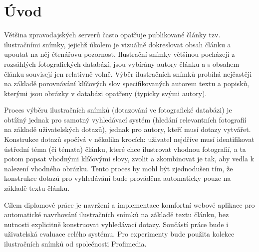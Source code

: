 \chapter*{Úvod}

Většina zpravodajských serverů často opatřuje publikované články tzv. ilustračními snímky, jejichž úkolem je vizuálně dokreslovat obsah článku a upoutat na něj čtenářovu pozornost. Ilustrační snímky většinou pocházejí z rozsáhlých fotografických databází, jsou vybírány autory článku a s obsahem článku souvisejí jen relativně volně. Výběr ilustračních snímků probíhá nejčastěji na základě porovnávání klíčových slov specifikovaných autorem textu a popisků, kterými jsou obrázky v databázi opatřeny (typicky svými autory). 

Proces výběru ilustračních snímků (dotazování ve fotografické databázi) je obtížný jednak pro samotný vyhledávací systém (hledání relevantních fotografií na základě uživatelských dotazů), jednak pro autory, kteří musí dotazy vytvářet. Konstrukce dotazů spočívá v několika krocích: uživatel nejdříve musí identifikovat ústřední téma (či témata) článku, které chce ilustrovat vhodnou fotografií, a ta potom popsat vhodnými klíčovými slovy, zvolit a zkombinovat je tak, aby vedla k nalezení vhodného obrázku. Tento proces by mohl být zjednodušen tím, že konstrukce dotazů pro vyhledávání bude prováděna automaticky pouze na základě textu článku. 

Cílem diplomové práce je navržení a implementace komfortní webové aplikace pro automatické navrhování ilustračních snímků na základě textu článku, bez nutnosti explicitně konstruovat vyhledávací dotazy. Součástí práce bude i uživatelská evaluace celého systému. Pro experimenty bude použita kolekce ilustračních snímků od společnosti Profimedia.

